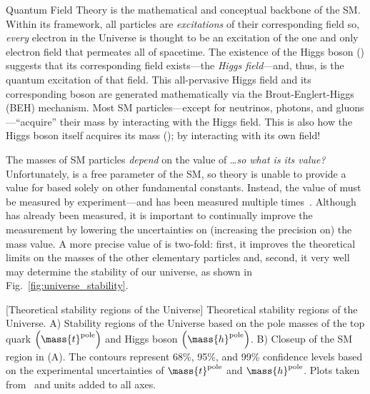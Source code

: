 Quantum Field Theory is the mathematical and conceptual backbone of the SM.
Within its framework, all particles are \emph{excitations} of their corresponding field so, \eg \emph{every} electron in the Universe is thought to be an excitation of the one and only electron field that permeates all of spacetime.
The existence of the Higgs boson (\PH) suggests that its corresponding field exists---the \emph{Higgs field}---and, thus, \PH is the quantum excitation of that field.
This all-pervasive Higgs field and its corresponding boson are generated mathematically via the Brout-Englert-Higgs (BEH) mechanism.
Most SM particles---except for neutrinos, photons, and gluons---``acquire'' their mass by interacting with the Higgs field.
This is also how the Higgs boson itself acquires its mass (\mH); by interacting with its own field!

The masses of SM particles \emph{depend} on the value of \mH\ldots \emph{so what is its value?}
Unfortunately, \mH is a free parameter of the SM, so theory is unable to provide a value for \mH based solely on other fundamental constants.
Instead, the value of \mH must be measured by experiment---and has been measured multiple times~\cite{PhysRevLett.114.191803, sirunyan_measurement_2020, aaboud_measurement_2018}.
Although \mH has already been measured, it is important to continually improve the measurement by lowering the uncertainties on (\ie increasing the precision on) the mass value.
A more precise value of \mH is two-fold:
first, it improves the theoretical limits on the masses of the other elementary particles and, second, it very well may determine the stability of our universe, as shown in Fig.~\ref{fig:universe_stability}.
\begin{multiFigure}
    \centering
        [Theoretical stability regions of the Universe]
        {Theoretical stability regions of the Universe.
        A) Stability regions of the Universe based on the pole masses of the top quark $\left( \mass{t}^\text{pole} \right)$ and Higgs boson $\left( \mass{h}^\text{pole} \right)$.
        B) Closeup of the SM region in (A).
        The contours represent 68\%, 95\%, and 99\% confidence levels based on the experimental uncertainties of $\mass{t}^\text{pole}$ and $\mass{h}^\text{pole}$.
        Plots taken from~\cite{univ_stab} and units added to all axes.
        }
    \label{fig:universe_stability}
\end{multiFigure}

